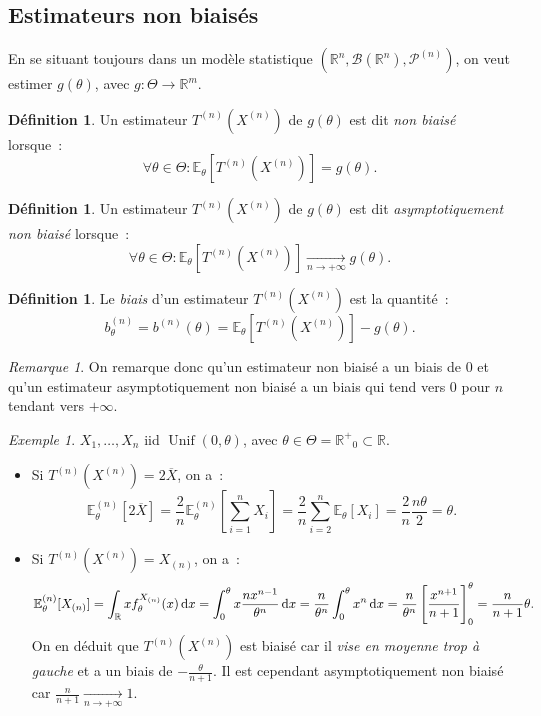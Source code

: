 \documentclass{report}
\DeclareMathOperator{\Unif}{Unif}  %
\newcommand{\E}{\mathbb E}
\newcommand{\pinfty}{{+\infty}}
\newcommand{\statmod}[4]{\left(#1^{#4}, #2\left(#1^{#4}\right), #3^{\left(#4\right)}\right)}
\newcommand{\R}{\mathbb R}
\newcommand{\Rp}{{\mathbb R^+}}
\newcommand{\Brl}{\mathcal B}  %
\theoremstyle{definition}
\newtheorem{déf}[thm]{Définition}
\theoremstyle{remark}
\newtheorem*{rmq}{Remarque}
\newtheorem{ex}{Exemple}[chapter]
\begin{document}
	\subsection{Estimateurs non biaisés}
		En se situant toujours dans un modèle statistique $\statmod \R\Brl{\mathcal P}n$, on veut estimer $g(\theta)$, avec $g : \Theta \to \R^m$.
		
		\begin{déf} Un estimateur $T^{(n)}(X^{(n)})$ de $g(\theta)$ est dit \textit{non biaisé} lorsque~:
		\[\forall \theta \in \Theta : \E_\theta[T^{(n)}(X^{(n)})] = g(\theta).\]
		\end{déf}
		
		\begin{déf} Un estimateur $T^{(n)}(X^{(n)})$ de $g(\theta)$ est dit \textit{asymptotiquement non biaisé} lorsque~:
		\[\forall \theta \in \Theta : \E_\theta[T^{(n)}(X^{(n)})] \xrightarrow[n \to \pinfty]{} g(\theta).\]
		\end{déf}
		
		\begin{déf} Le \textit{biais} d'un estimateur $T^{(n)}(X^ {(n)})$ est la quantité~:
		\[b^{(n)}_\theta = b^{(n)}(\theta) = \E_\theta[T^{(n)}(X^{(n)})] - g(\theta).\]
		\end{déf}
		
		\begin{rmq} On remarque donc qu'un estimateur non biaisé a un biais de 0 et qu'un estimateur asymptotiquement non biaisé a un biais qui tend vers 0 pour
		$n$ tendant vers $\pinfty$.
		\end{rmq}
		
		\begin{ex} $X_1, \ldots, X_n$ iid $\Unif(0, \theta)$, avec $\theta \in \Theta = \Rp_0 \subset \R$.
		\begin{itemize}
			\item Si $T^{(n)}(X^{(n)}) = 2\overline X$, on a~:
			\[\E_\theta^{(n)}\left[2\overline X\right] = \frac 2n\E_\theta^{(n)}\left[\sum_{i=1}^nX_i\right] = \frac 2n\sum_{i=2}^n\E_\theta[X_i]
				= \frac 2n\frac {n\theta}2 = \theta.\]
			\item Si $T^{(n)}(X^{(n)}) = X_{(n)}$, on a~:
			\[\E_\theta^{(n)}[X_{(n)}] = \int_\R xf_\theta^{X_{(n)}}(x)\dif x = \int_0^\theta x\frac {nx^{n-1}}{\theta^n}\dif x
				= \frac n{\theta^n}\int_0^\theta x^n\dif x = \frac n{\theta^n}\left[\frac {x^{n+1}}{n+1}\right]_0^\theta = \frac n{n+1}\theta.\]
			On en déduit que $T^{(n)}(X^{(n)})$ est biaisé car il \textit{vise en moyenne trop à gauche} et a un biais de $-\frac \theta{n+1}$. Il est cependant
			asymptotiquement non biaisé car $\frac n{n+1} \xrightarrow[n \to \pinfty]{} 1$.
		\end{itemize}
		\end{ex}
		
\end{document}
